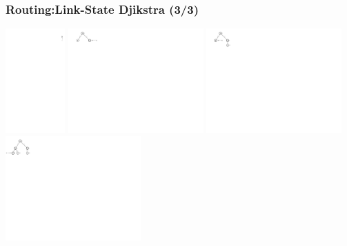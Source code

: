\documentclass[ignorenonframetext]{beamer}
\begin{document}
\begin{frame}
\frametitle{Routing:Link-State Djikstra (3/3)}
\vspace{1cm}
	\includegraphics[height=4cm]{djikstra-tree-0}
	\includegraphics[height=4cm]{djikstra-tree-1}
	\includegraphics[height=4cm]{djikstra-tree-2}
	\includegraphics[height=4cm]{djikstra-tree-3}
\\
\vspace{-1cm}


\end{frame}
\end{document}
